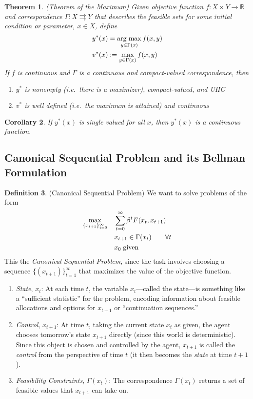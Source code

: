 \documentclass[12pt]{article}
\numberwithin{equation}{section} %
\theoremstyle{plain}
\newtheorem{thm}{Theorem}[section]
\newtheorem{cor}[thm]{Corollary}
\theoremstyle{definition}
\newtheorem{defn}[thm]{Definition}
\theoremstyle{remark}
\newcommand{\R}{\mathbb{R}}
\DeclareMathOperator*{\argmax}{arg\;max}
\newcommand{\sumtinfz}{\sum^\infty_{t=0}}
\begin{document}
\begin{thm}{\emph{(Theorem of the Maximum)}}
Given objective function $f:X\times Y\rightarrow\R$ and correspondence
$\Gamma:X\rightrightarrows Y$ that describes the feasible sets for some
initial condition or parameter, $x\in X$, define
\begin{align}
  y^*(x) &= \argmax_{y\in \Gamma(x)} f(x,y) \notag\\
  v^*(x) &:= \max_{y\in \Gamma(x)} f(x,y)
  \label{prob:thm-max}
\end{align}
If $f$ is continuous and $\Gamma$ is a continuous and compact-valued
correspondence, then
\begin{enumerate}
  \item $y^*$ is nonempty (i.e.\ there is a maximizer), compact-valued,
    and UHC
  \item $v^*$ is well defined (i.e.\ the maximum is attained) and
    continuous
\end{enumerate}
\end{thm}

\begin{cor}
If $y^*(x)$ is single valued for all $x$, then $y^*(x)$ is a continuous
function.
\end{cor}


\clearpage
\subsection{Canonical Sequential Problem and its Bellman Formulation}


\begin{defn}{(Canonical Sequential Problem)}
We want to solve problems of the form
\begin{align}
  \label{prob:sequential-short}
  \max_{\{x_{t+1}\}_{t=0}^\infty}
  \quad &\sumtinfz \beta^t F(x_t,x_{t+1})\\
  &x_{t+1} \in \Gamma(x_t) \qquad \forall t\notag\\
  &x_0 \; \text{given}\notag
\end{align}
This the \emph{Canonical Sequential Problem}, since the task involves
choosing a sequence $\{(x_{t+1})\}_{t=1}^\infty$ that maximizes the
value of the objective function.
\begin{enumerate}
  \item \emph{State}, $x_t$: At each time $t$, the variable
    $x_t$---called the state---is something like a ``sufficient
    statistic'' for the problem, encoding information about feasible
    allocations and options for $x_{t+1}$ or ``continuation sequences.''
  \item \emph{Control}, $x_{t+1}$: At time $t$, taking the current state
    $x_t$ as given, the agent chooses tomorrow's state $x_{t+1}$
    directly (since this world is deterministic). Since this object is
    chosen and controlled by the agent, $x_{t+1}$ is called the
    \emph{control} from the perspective of time $t$ (it then becomes the
    \emph{state} at time $t+1$).
  \item \emph{Feasibility Constraints}, $\Gamma(x_t)$: The
    correspondence $\Gamma(x_t)$ returns a set of feasible values that
    $x_{t+1}$ can take on.
\end{enumerate}
\end{defn}
\end{document}
